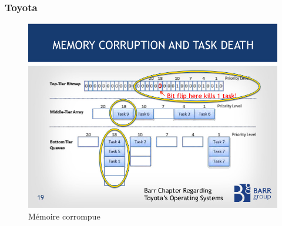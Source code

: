 \documentclass[french,handout]{beamer}
\begin{document}











\begin{frame}\frametitle{Toyota}

  \begin{figure}
\centering
\includegraphics[width=.9\linewidth]{toyota.jpg}
\caption{Mémoire corrompue}
\end{figure}
  
\end{frame}
\end{document}
